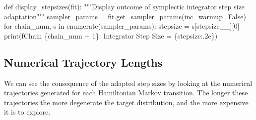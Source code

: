\documentclass[
  letterpaper,
  DIV=11,
  numbers=noendperiod]{scrartcl}
\newenvironment{Shaded}{\begin{snugshade}}{\end{snugshade}}
\newcommand{\BuiltInTok}[1]{\textcolor[rgb]{0.00,0.23,0.31}{#1}}
\newcommand{\CommentTok}[1]{\textcolor[rgb]{0.37,0.37,0.37}{#1}}
\newcommand{\ControlFlowTok}[1]{\textcolor[rgb]{0.00,0.23,0.31}{#1}}
\newcommand{\DecValTok}[1]{\textcolor[rgb]{0.68,0.00,0.00}{#1}}
\newcommand{\KeywordTok}[1]{\textcolor[rgb]{0.00,0.23,0.31}{#1}}
\newcommand{\NormalTok}[1]{\textcolor[rgb]{0.00,0.23,0.31}{#1}}
\newcommand{\OperatorTok}[1]{\textcolor[rgb]{0.37,0.37,0.37}{#1}}
\newcommand{\SpecialCharTok}[1]{\textcolor[rgb]{0.37,0.37,0.37}{#1}}
\newcommand{\SpecialStringTok}[1]{\textcolor[rgb]{0.13,0.47,0.30}{#1}}
\newcommand{\StringTok}[1]{\textcolor[rgb]{0.13,0.47,0.30}{#1}}
\newcommand{\VariableTok}[1]{\textcolor[rgb]{0.07,0.07,0.07}{#1}}
\begin{document}
\begin{Shaded}
\begin{Highlighting}[]
\KeywordTok{def}\NormalTok{ display\_stepsizes(fit):}
  \CommentTok{"""Display outcome of symplectic integrator step size adaptation"""}
\NormalTok{  sampler\_params }\OperatorTok{=}\NormalTok{ fit.get\_sampler\_params(inc\_warmup}\OperatorTok{=}\VariableTok{False}\NormalTok{)}
  \ControlFlowTok{for}\NormalTok{ chain\_num, s }\KeywordTok{in} \BuiltInTok{enumerate}\NormalTok{(sampler\_params):}
\NormalTok{    stepsize }\OperatorTok{=}\NormalTok{ s[}\StringTok{\textquotesingle{}stepsize\_\_\textquotesingle{}}\NormalTok{][}\DecValTok{0}\NormalTok{]}
    \BuiltInTok{print}\NormalTok{(}\SpecialStringTok{f\textquotesingle{}Chain }\SpecialCharTok{\{}\NormalTok{chain\_num }\OperatorTok{+} \DecValTok{1}\SpecialCharTok{\}}\SpecialStringTok{: Integrator Step Size = }\SpecialCharTok{\{}\NormalTok{stepsize}\SpecialCharTok{:.2e\}}\SpecialStringTok{\textquotesingle{}}\NormalTok{)}
\end{Highlighting}
\end{Shaded}

\hypertarget{numerical-trajectory-lengths}{%
\subsection{Numerical Trajectory
Lengths}\label{numerical-trajectory-lengths}}

We can see the consequence of the adapted step sizes by looking at the
numerical trajectories generated for each Hamiltonian Markov transition.
The longer these trajectories the more degenerate the target
distribution, and the more expensive it is to explore.
\end{document}
